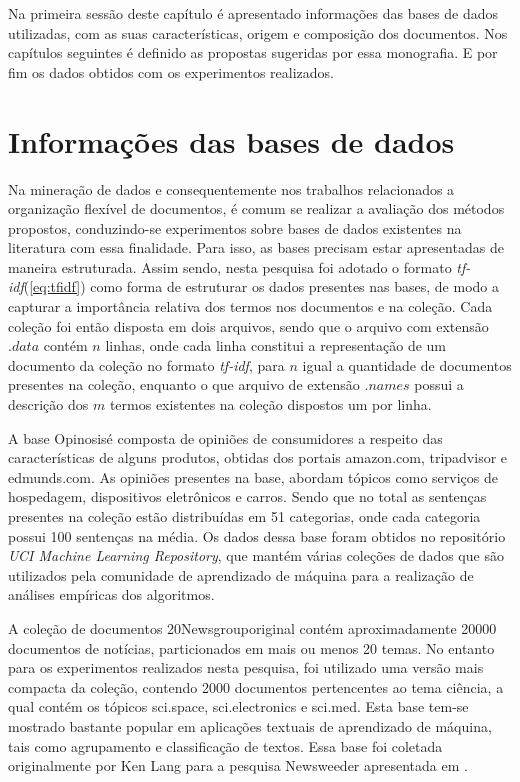 Na primeira sessão deste capítulo é apresentado informações das bases de dados utilizadas, com as
suas características, origem e composição dos documentos. Nos capítulos seguintes é definido as
propostas sugeridas por essa monografia. E por fim os dados obtidos com os experimentos realizados.

\section{Informações das bases de dados}

Na mineração de dados e consequentemente nos trabalhos relacionados a organização flexível de
documentos, é comum se realizar a avaliação dos métodos propostos, conduzindo-se experimentos sobre
bases de dados existentes na literatura com essa finalidade\cite{Rossi2013}. Para isso, as bases
precisam estar apresentadas de maneira estruturada. Assim sendo, nesta pesquisa foi adotado o formato
{\it tf-idf\/}(\ref{eq:tfidf}) como forma de estruturar os dados presentes nas bases, 
de modo a capturar a
importância relativa dos termos nos documentos e na coleção. Cada coleção foi então disposta em dois
arquivos, sendo que o arquivo com extensão $.data$ contém $n$ linhas, onde cada linha constitui a 
representação de um
documento da coleção no formato {\it tf-idf\/}, para $n$ igual a quantidade de documentos 
presentes na
coleção, enquanto o que arquivo de extensão $.names$ possui a descrição dos $m$ termos existentes na
coleção dispostos um por linha.

A base Opinosis\footnotemark é composta de opiniões de consumidores a respeito das características de alguns
produtos, obtidas dos portais amazon.com, tripadvisor e edmunds.com. As opiniões presentes na base,
abordam tópicos como serviços de hospedagem, dispositivos eletrônicos e carros. Sendo que no total
as sentenças presentes na coleção estão distribuídas em 51 categorias, onde cada categoria possui
100 sentenças na média. Os dados dessa base
foram obtidos no repositório {\it UCI Machine Learning Repository\/}\cite{Frank2010}, 
que mantém várias coleções de
dados que são utilizados pela comunidade de aprendizado de máquina para a realização de análises
empíricas dos algoritmos.

A coleção de documentos 20Newsgroup\footnotemark original contém aproximadamente 20000 documentos de notícias,
particionados em mais ou menos 20 temas. No entanto para os experimentos realizados nesta pesquisa, 
foi utilizado uma versão mais
compacta da coleção, contendo 2000 documentos pertencentes ao tema ciência, a qual contém os tópicos
sci.space, sci.electronics e sci.med. Esta base tem-se mostrado bastante popular em
aplicações textuais de aprendizado de máquina\cite{Nogueira2015}, tais como agrupamento e 
classificação de textos.
Essa base foi coletada originalmente por Ken Lang para a pesquisa Newsweeder apresentada em
\cite{Lang1995}. 

